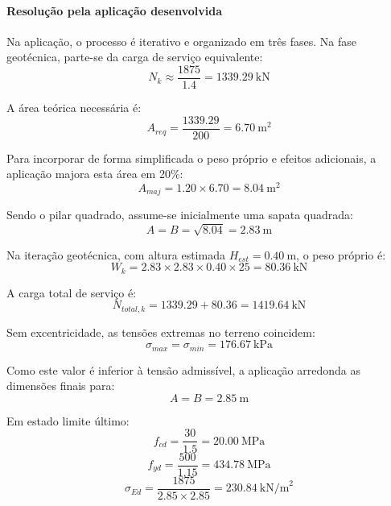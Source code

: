 \paragraph{Resolução pela aplicação desenvolvida}

Na aplicação, o processo é iterativo e organizado em três fases. Na fase geotécnica, parte-se da carga de serviço equivalente:
\begin{equation}
N_k \approx \frac{1875}{1.4}=1339.29\ \text{kN}
\end{equation}

A área teórica necessária é:
\begin{equation}
A_{req}=\frac{1339.29}{200}=6.70\ \text{m}^2
\end{equation}

Para incorporar de forma simplificada o peso próprio e efeitos adicionais, a aplicação majora esta área em 20\%:
\begin{equation}
A_{maj}=1.20\times 6.70=8.04\ \text{m}^2
\end{equation}

Sendo o pilar quadrado, assume-se inicialmente uma sapata quadrada:
\begin{equation}
A=B=\sqrt{8.04}=2.83\ \text{m}
\end{equation}

Na iteração geotécnica, com altura estimada \(H_{est}=0.40\ \text{m}\), o peso próprio é:
\begin{equation}
W_k = 2.83\times 2.83\times 0.40\times 25=80.36\ \text{kN}
\end{equation}

A carga total de serviço é:
\begin{equation}
N_{total,k}=1339.29+80.36=1419.64\ \text{kN}
\end{equation}

Sem excentricidade, as tensões extremas no terreno coincidem:
\begin{equation}
\sigma_{max}=\sigma_{min}=176.67\ \text{kPa}
\end{equation}

Como este valor é inferior à tensão admissível, a aplicação arredonda as dimensões finais para:
\begin{equation}
A=B=2.85\ \text{m}
\end{equation}

Em estado limite último:
\begin{equation}
f_{cd}=\frac{30}{1.5}=20.00\ \text{MPa}
\end{equation}
\begin{equation}
f_{yd}=\frac{500}{1.15}=434.78\ \text{MPa}
\end{equation}
\begin{equation}
\sigma_{Ed}=\frac{1875}{2.85\times 2.85}=230.84\ \text{kN/m}^2
\end{equation}

